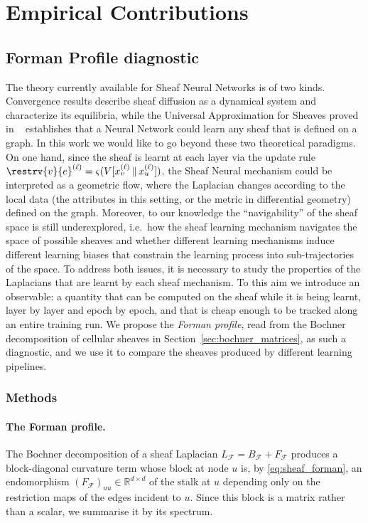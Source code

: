 \section{Empirical Contributions}
\label{sec:empirical_contributions}

\subsection{Forman Profile diagnostic}
\label{sec:forman_profile}


The theory currently available for Sheaf Neural Networks is of two kinds.
Convergence results describe sheaf diffusion as a dynamical system and characterize its equilibria, while the Universal Approximation for Sheaves proved in ~\cite{bodnar2022neural} establishes that a Neural Network could learn any sheaf that is defined on a graph.
In this work we would like to go beyond these two theoretical paradigms.
On one hand, since the sheaf is learnt at each layer via the update rule $\restrv{v}{e}^{(\ell)} = \varsigma(V[x_v^{(\ell)} \,\|\, x_u^{(\ell)}])$, the Sheaf Neural mechanism could be interpreted as a geometric flow, where the Laplacian changes according to the local data (the attributes in this setting, or the metric in differential geometry) defined on the graph.
Moreover, to our knowledge the ``navigability'' of the sheaf space is still underexplored, i.e.\ how the sheaf learning mechanism navigates the space of possible sheaves and whether different learning mechanisms induce different learning biases that constrain the learning process into sub-trajectories of the space.
To address both issues, it is necessary to study the properties of the Laplacians that are learnt by each sheaf mechanism.
To this aim we introduce an observable: a quantity that can be computed on the sheaf
while it is being learnt, layer by layer and epoch by epoch, and that is cheap
enough to be tracked along an entire training run. We propose the \emph{Forman
profile}, read from the Bochner decomposition of cellular sheaves in Section~\ref{sec:bochner_matrices},
as such a diagnostic, and we use it to compare the sheaves produced by
different learning pipelines.

\subsubsection{Methods}
\paragraph{The Forman profile.}
The Bochner decomposition of a sheaf Laplacian
$L_{\mathcal{F}} = B_{\mathcal{F}} + F_{\mathcal{F}}$ produces a
block-diagonal curvature term whose block at node $u$ is, by
\eqref{eq:sheaf_forman}, an endomorphism
$(F_{\mathcal{F}})_{uu} \in \mathbb{R}^{d\times d}$ of the stalk at $u$
depending only on the restriction maps of the edges incident to $u$. Since this
block is a matrix rather than a scalar, we summarise it by its spectrum.

